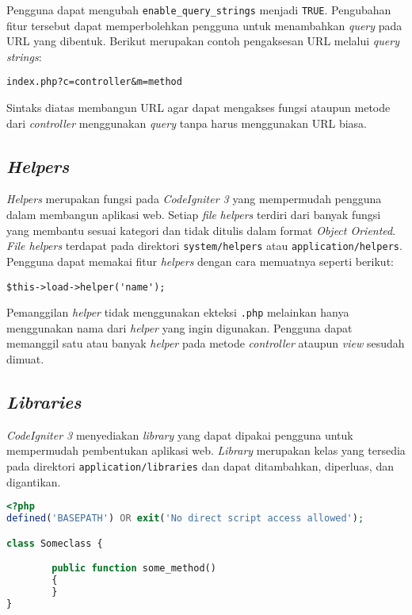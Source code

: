 Pengguna dapat mengubah \verb|enable_query_strings| menjadi \texttt{TRUE}. Pengubahan fitur tersebut dapat memperbolehkan pengguna untuk menambahkan \textit{query} pada URL yang dibentuk. Berikut merupakan contoh pengaksesan URL melalui \textit{query strings}:

\begin{center}
\verb|index.php?c=controller&m=method|
\end{center}

Sintaks diatas membangun URL agar dapat mengakses fungsi ataupun metode dari \textit{controller} menggunakan \textit{query} tanpa harus menggunakan URL biasa.

\subsection{\textit{Helpers}}
\textit{Helpers} merupakan fungsi pada \textit{CodeIgniter 3}
yang mempermudah pengguna dalam membangun aplikasi web. Setiap \textit{file} \textit{helpers} terdiri dari banyak fungsi yang membantu sesuai kategori dan tidak ditulis dalam format \textit{Object Oriented}. \textit{File helpers} terdapat pada direktori \texttt{system/helpers} atau \texttt{application/helpers}. Pengguna dapat memakai fitur \textit{helpers} dengan cara memuatnya seperti berikut:

\begin{center}
\verb|$this->load->helper('name');|
\end{center}

Pemanggilan \textit{helper} tidak menggunakan ekteksi \texttt{.php} melainkan hanya menggunakan nama dari \textit{helper} yang ingin digunakan. Pengguna dapat memanggil satu atau banyak \textit{helper} pada metode \textit{controller} ataupun \textit{view} sesudah dimuat.

\subsection{\textit{Libraries}}
\textit{CodeIgniter 3} menyediakan \textit{library} yang dapat dipakai pengguna untuk mempermudah pembentukan aplikasi web. \textit{Library} merupakan kelas yang tersedia pada direktori \texttt{application/libraries} dan dapat ditambahkan, diperluas, dan digantikan. 

\begin{lstlisting}[language=PHP, caption=Contoh kelas \textit{library} pada \textit{CodeIgniter 3}, label=kode:libraryclass]
<?php
defined('BASEPATH') OR exit('No direct script access allowed');

class Someclass {

        public function some_method()
        {
        }
}
\end{lstlisting}

